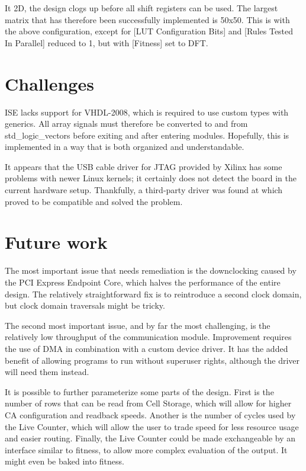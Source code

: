 It 2D, the design clogs up before all shift registers can be used.
The largest matrix that has therefore been successfully implemented is 50x50.
This is with the above configuration, except for [LUT Configuration Bits] and [Rules Tested In Parallel] reduced to 1, but with [Fitness] set to DFT.


\section{Challenges}
\label{sec:challenges}

ISE lacks support for VHDL-2008, which is required to use custom types with generics.
All array signals must therefore be converted to and from std\_logic\_vectors before exiting and after entering modules.
Hopefully, this is implemented in a way that is both organized and understandable.

It appears that the USB cable driver for JTAG provided by Xilinx has some problems with newer Linux kernels; it certainly does not detect the board in the current hardware setup.
Thankfully, a third-party driver was found at \cite{usbdriver} which proved to be compatible and solved the problem.


\section{Future work}

The most important issue that needs remediation is the downclocking caused by the PCI Express Endpoint Core, which halves the performance of the entire design.
The relatively straightforward fix is to reintroduce a second clock domain, but clock domain traversals might be tricky.

The second most important issue, and by far the most challenging, is the relatively low throughput of the communication module.
Improvement requires the use of DMA in combination with a custom device driver.
It has the added benefit of allowing programs to run without superuser rights, although the driver will need them instead.

It is possible to further parameterize some parts of the design.
First is the number of rows that can be read from Cell Storage, which will allow for higher CA configuration and readback speeds.
Another is the number of cycles used by the Live Counter, which will allow the user to trade speed for less resource usage and easier routing.
Finally, the Live Counter could be made exchangeable by an interface similar to fitness, to allow more complex evaluation of the output.
It might even be baked into fitness.

